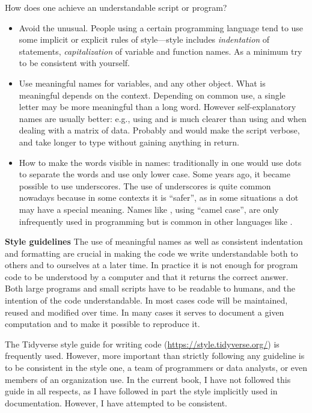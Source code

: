 \begin{playground}
How does one achieve an understandable script or program?
\begin{itemize}
  \item Avoid the unusual. People using a certain programming language tend to use some implicit or explicit rules of style---style includes \textit{indentation} of statements, \textit{capitalization} of variable and function names. As a minimum try to be consistent with yourself.
  \item Use meaningful names for variables, and any other object. What is meaningful depends on the context. Depending on common use, a single letter may be more meaningful than a long word. However self-explanatory names are usually better: e.g.,  using  and  is much clearer than using  and  when dealing with a matrix of data. Probably  and  would make the script verbose, and take longer to type without gaining anything in return.
  \item How to make the words visible in names: traditionally in \Rlang one would use dots to separate the words and use only lower case. Some years ago, it became possible to use underscores. The use of underscores is quite common nowadays because in some contexts it is ``safer'', as in some situations a dot may have a special meaning. Names like , using ``camel case'', are only infrequently used in \Rlang programming but is common in other languages like \pascallang.
\end{itemize}

\begin{infobox}
\textbf{Style guidelines} The use of meaningful names as well as consistent indentation and formatting are crucial in making the code we write understandable both to others and to ourselves at a later time. In practice it is not enough for program code to be understood by a computer and that it returns the correct answer. Both large programs and small scripts have to be readable to humans, and the intention of the code understandable. In most cases \Rlang code will be maintained, reused and modified over time. In many cases it serves to document a given computation and to make it possible to reproduce it.

The Tidyverse style guide for writing \Rlang code (\url{https://style.tidyverse.org/}) is frequently used. However, more important than strictly following any guideline is to be consistent in the style one, a team of programmers or data analysts, or even members of an organization use. In the current book, I have not followed this guide in all respects, as I have followed in part the style implicitly used in \Rlang documentation. However, I have attempted to be consistent.


\end{infobox}
\end{playground}
